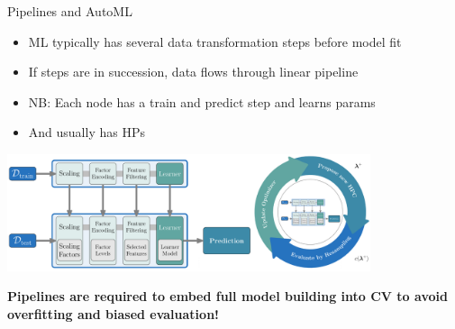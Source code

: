 \begin{vbframe}{Pipelines and AutoML}
\begin{itemize}
    \item ML typically has several data transformation steps before model fit
    \item If steps are in succession, data flows through linear pipeline
    \item NB: Each node has a train and predict step and learns params
    \item And usually has HPs
\end{itemize}


\vspace{0.5em}

\begin{center}
\includegraphics[width = 0.8\textwidth]{figure_man/linear_pipeline.png}
\end{center}

\vspace{0.5em}

\pause
\textbf{Pipelines are required to embed full model building into CV to avoid overfitting and biased evaluation!}
\end{vbframe}

